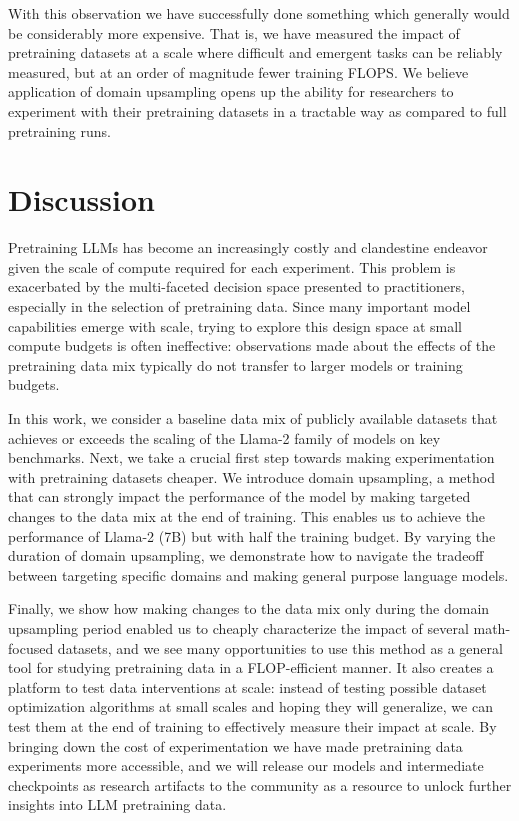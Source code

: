 \documentclass[10pt]{article} %
\begin{document}
With this observation we have successfully done something which generally would be considerably more expensive. That is, we have measured the impact of pretraining datasets at a scale where difficult and emergent tasks can be reliably measured, but at an order of magnitude fewer training FLOPS. We believe application of domain upsampling opens up the ability for researchers to experiment with their pretraining datasets in a tractable way as compared to full pretraining runs. 


\section{Discussion}

Pretraining LLMs has become an increasingly costly and clandestine endeavor given the scale of compute required for each experiment.
This problem is exacerbated by the multi-faceted decision space presented to practitioners, especially in the selection of pretraining data.
Since many important model capabilities emerge with scale, trying to explore this design space at small compute budgets is often ineffective: observations made about the effects of the pretraining data mix typically do not transfer to larger models or training budgets.

In this work, we consider a baseline data mix of publicly available datasets that achieves or exceeds the scaling of the Llama-2 family of models on key benchmarks.
Next, we take a crucial first step towards making experimentation with pretraining datasets cheaper.
We introduce domain upsampling, a method that can strongly impact the performance of the model by making targeted changes to the data mix at the end of training.
This enables us to achieve the performance of Llama-2 (7B) but with half the training budget.
By varying the duration of domain upsampling, we demonstrate how to navigate the tradeoff between targeting specific domains and making general purpose language models.

Finally, we show how making changes to the data mix only during the domain upsampling period enabled us to cheaply characterize the impact of several math-focused datasets, and we see many opportunities to use this method as a general tool for studying pretraining data in a FLOP-efficient manner.
It also creates a platform to test data interventions at scale: instead of testing possible dataset optimization algorithms at small scales and hoping they will generalize, we can test them at the end of training to effectively measure their impact at scale. 
By bringing down the cost of experimentation we have made pretraining data experiments more accessible, and
we will release our models and intermediate checkpoints as research artifacts to the community as a resource to unlock further insights into LLM pretraining data.
\end{document}
